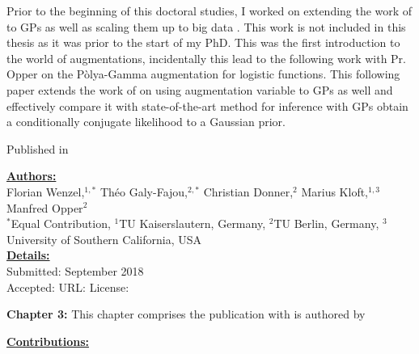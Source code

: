 


\graphicspath{{3/figures/}}

Prior to the beginning of this doctoral studies, I worked on extending the work of \citet{henaoBayesianNonlinearSupport2014} to \ac{GPs} as well as scaling them up to big data \cite{wenzel2017bayesian}.
This work is not included in this thesis as it was prior to the start of my PhD.
This was the first introduction to the world of augmentations, incidentally this lead to the following work with Pr. Opper on the P\`olya-Gamma augmentation for logistic functions.
This following paper extends the work of \citet{polsonBayesianInferenceLogistic2012} on using augmentation variable to \ac{GPs} as well and effectively compare it with state-of-the-art method for inference with \ac{GPs} obtain a conditionally conjugate likelihood to a Gaussian prior.

Published in 

\textbf{\underline{Authors:}}\\
Florian Wenzel,$^{1,*}$ Th\'eo Galy-Fajou,$^{2,*}$ Christian Donner,$^{2}$ Marius Kloft,$^{1,3}$ Manfred Opper$^2$\\
$^*$Equal Contribution, $^1$TU Kaiserslautern, Germany, $^2$TU Berlin, Germany, $^3$University of Southern California, USA\\

\textbf{\underline{Details:}}\\
Submitted: September 2018\\
Accepted: 
URL:
License:

\textbf{Chapter 3:} This chapter comprises the publication with is authored by 

\textbf{\underline{Contributions:}}\\



